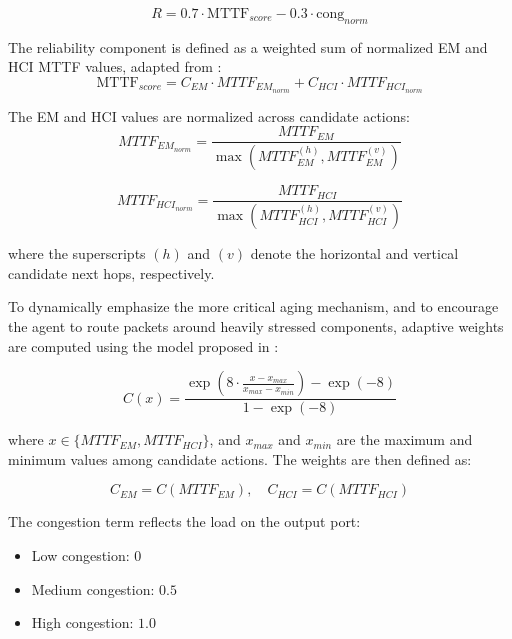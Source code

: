\begin{equation}
R = 0.7 \cdot \text{MTTF}_{score} - 0.3 \cdot \text{cong}_{norm}
\end{equation}

The reliability component is defined as a weighted sum of normalized EM and HCI MTTF values, adapted from \cite{Clotho2015}:
\begin{equation}
\text{MTTF}_{score} = C_{EM} \cdot MTTF_{EM_{norm}} + C_{HCI} \cdot MTTF_{HCI_{norm}}
\end{equation}

The EM and HCI values are normalized across candidate actions:
\begin{equation}
MTTF_{EM_{norm}} = \frac{MTTF_{EM}}{\max(MTTF_{EM}^{(h)}, MTTF_{EM}^{(v)})}
\end{equation}

\begin{equation}
MTTF_{HCI_{norm}} = \frac{MTTF_{HCI}}{\max(MTTF_{HCI}^{(h)}, MTTF_{HCI}^{(v)})}
\end{equation}

where the superscripts $(h)$ and $(v)$ denote the horizontal and vertical candidate next hops, respectively.

To dynamically emphasize the more critical aging mechanism, and to encourage the agent to route packets around heavily stressed components, adaptive weights are computed using the model proposed in \cite{Clotho2015}:

\begin{equation}
C(x) =
\frac{\exp\left(8 \cdot \frac{x - x_{max}}{x_{max} - x_{min}}\right) - \exp(-8)}
{1 - \exp(-8)}
\end{equation}

where $x \in \{MTTF_{EM}, MTTF_{HCI}\}$, and $x_{max}$ and $x_{min}$ are the maximum and minimum values among candidate actions. The weights are then defined as:

\begin{equation}
C_{EM} = C(MTTF_{EM}), \quad C_{HCI} = C(MTTF_{HCI})
\end{equation}

The congestion term reflects the load on the output port:
\begin{itemize}
    \item Low congestion: $0$
    \item Medium congestion: $0.5$
    \item High congestion: $1.0$
\end{itemize}


